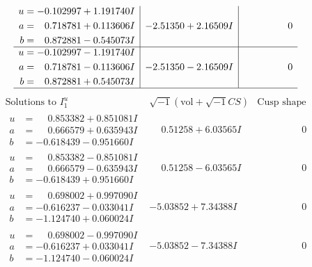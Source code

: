 \documentclass[1p]{elsarticle_modified}
\theoremstyle{definition}
\newcommand{\I}{\sqrt{-1}}
\begin{document}
$$\begin{array}{c|c|c}
\begin{aligned}
u &= -0.102997 + 1.191740 I \\
a &= \phantom{-}0.718781 + 0.113606 I \\
b &= \phantom{-}0.872881 - 0.545073 I\end{aligned}
 & -2.51350 + 2.16509 I & \phantom{-0.000000 } 0 \\ \hline\begin{aligned}
u &= -0.102997 - 1.191740 I \\
a &= \phantom{-}0.718781 - 0.113606 I \\
b &= \phantom{-}0.872881 + 0.545073 I\end{aligned}
 & -2.51350 - 2.16509 I & \phantom{-0.000000 } 0\\
 \hline 
 \end{array}$$\newpage$$\begin{array}{c|c|c}  
\text{Solutions to }I^u_{1}& \I (\text{vol} + \sqrt{-1}CS) & \text{Cusp shape}\\
 \hline 
\begin{aligned}
u &= \phantom{-}0.853382 + 0.851081 I \\
a &= \phantom{-}0.666579 + 0.635943 I \\
b &= -0.618439 - 0.951660 I\end{aligned}
 & \phantom{-}0.51258 + 6.03565 I & \phantom{-0.000000 } 0 \\ \hline\begin{aligned}
u &= \phantom{-}0.853382 - 0.851081 I \\
a &= \phantom{-}0.666579 - 0.635943 I \\
b &= -0.618439 + 0.951660 I\end{aligned}
 & \phantom{-}0.51258 - 6.03565 I & \phantom{-0.000000 } 0 \\ \hline\begin{aligned}
u &= \phantom{-}0.698002 + 0.997090 I \\
a &= -0.616237 - 0.033041 I \\
b &= -1.124740 + 0.060024 I\end{aligned}
 & -5.03852 + 7.34388 I & \phantom{-0.000000 } 0 \\ \hline\begin{aligned}
u &= \phantom{-}0.698002 - 0.997090 I \\
a &= -0.616237 + 0.033041 I \\
b &= -1.124740 - 0.060024 I\end{aligned}
 & -5.03852 - 7.34388 I & \phantom{-0.000000 } 0 \\ \hline\begin{aligned}

\end{aligned}
\end{array}$$
\end{document}
